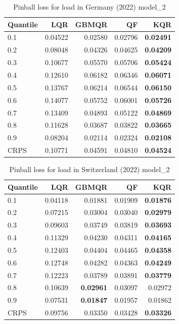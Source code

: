 \begin{table}[!ht]
    \centering
    \caption{Pinball loss for load in Germany (2022) model\_2}
    \label{tab:energy_chart_de_additional_predictors}
    \begin{tabular}{lrrrr}
    \toprule
    Quantile & LQR & GBMQR & QF & KQR \\
    \midrule
    0.1 & 0.04522 & 0.02580 & 0.02796 & \textbf{0.02491} \\
    0.2 & 0.08048 & 0.04326 & 0.04625 & \textbf{0.04209} \\
    0.3 & 0.10677 & 0.05570 & 0.05706 & \textbf{0.05424} \\
    0.4 & 0.12610 & 0.06182 & 0.06346 & \textbf{0.06071}\\
    0.5 & 0.13767 & 0.06214 & 0.06544 & \textbf{0.06150} \\
    0.6 & 0.14077 & 0.05752 & 0.06001 & \textbf{0.05726} \\
    0.7 & 0.13409 & 0.04893 & 0.05122 & \textbf{0.04869} \\
    0.8 & 0.11628 & 0.03687 & 0.03822 & \textbf{0.03665} \\
    0.9 & 0.08204 & 0.02114 & 0.02324 & \textbf{0.02108} \\
    \midrule
    CRPS & 0.10771 & 0.04591 & 0.04810 & \textbf{0.04524} \\
    \bottomrule
    \end{tabular}
    \end{table}
    


\begin{table}[!ht]
    \centering
    \caption{Pinball loss for load in Switzerland (2022) model\_2}
    \label{tab:energy_chart_ch_additional_predictors}
    \begin{tabular}{lrrrr}
    \toprule
    Quantile & LQR & GBMQR & QF & KQR \\
    \midrule
    0.1 & 0.04118 & 0.01881 & 0.01909 & \textbf{0.01876} \\
    0.2 & 0.07215 & 0.03004 & 0.03040 & \textbf{0.02979} \\
    0.3 & 0.09603 & 0.03749 & 0.03819 & \textbf{0.03693} \\
    0.4 & 0.11329 & 0.04230 & 0.04311 & \textbf{0.04165} \\
    0.5 & 0.12403 & 0.04404 & 0.04465 & \textbf{0.04358} \\
    0.6 & 0.12748 & 0.04282 & 0.04363 & \textbf{0.04249} \\
    0.7 & 0.12223 & 0.03789 & 0.03891 & \textbf{0.03779} \\
    0.8 & 0.10639 & \textbf{0.02961} & 0.03097 & 0.02972 \\
    0.9 & 0.07531 & \textbf{0.01847} & 0.01957 & 0.01862 \\
    \midrule
    CRPS & 0.09756 & 0.03350 & 0.03428 & \textbf{0.03326} \\
    \bottomrule
    \end{tabular}
    \end{table}
    
